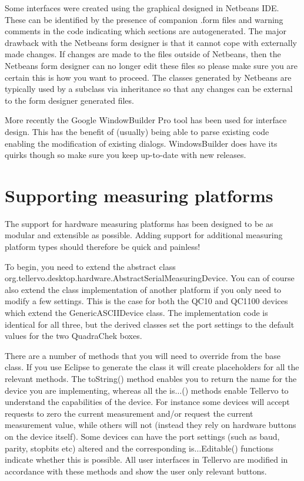 Some interfaces were created using the graphical designed in Netbeans IDE.  These can be identified by the presence of companion .form files and warning comments in the code indicating which sections are autogenerated.  The major drawback with the Netbeans form designer is that it cannot cope with externally made changes.   If changes are made to the files outside of Netbeans, then the Netbeans form designer can no longer edit these files so please make sure you are certain this is how you want to proceed.  The classes generated by Netbeans are typically used by a subclass via inheritance so that any changes can be external to the form designer generated files. 

More recently the Google WindowBuilder Pro tool has been used for interface design.  This has the benefit of (usually) being able to parse existing code enabling the modification of existing dialogs.  WindowsBuilder does have its quirks though so make sure you keep up-to-date with new releases.

\section{Supporting measuring platforms}
\label{txtSupportingNewMeasuringPlatforms}
The support for hardware measuring platforms has been designed to be as modular and extensible as possible. Adding support for additional measuring platform types should therefore be quick and painless!  

To begin, you need to extend the abstract class org.tellervo.desktop.hardware.AbstractSerialMeasuringDevice.  You can of course also extend the class implementation of another platform if you only need to modify a few settings.  This is the case for both the QC10 and QC1100 devices which extend the GenericASCIIDevice class.  The implementation code is identical for all three, but the derived classes set the port settings to the default values for the two QuadraChek boxes.

There are a number of methods that you will need to override from the base class.  If you use Eclipse to generate the class it will create placeholders for all the relevant methods.  The toString() method enables you to return the name for the device you are implementing, whereas all the is$\ldots$() methods enable Tellervo to understand the capabilities of the device.  For instance some devices will accept requests to zero the current measurement and/or request the current measurement value, while others will not (instead they rely on hardware buttons on the device itself).  Some devices can have the port settings (such as baud, parity, stopbits etc) altered and the corresponding is$\ldots$Editable() functions indicate whether this is possible.  All user interfaces in Tellervo are modified in accordance with these methods and show the user only relevant buttons.


